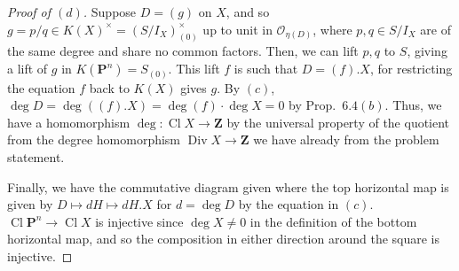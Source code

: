 \documentclass[10pt]{article}
\theoremstyle{definition}
\theoremstyle{remark}
\numberwithin{equation}{section}
\numberwithin{figure}{subsubsection}
\DeclareMathOperator{\Div}{Div}
\DeclareMathOperator{\Cl}{Cl}
\newcommand{\OO}{\mathcal{O}}
\begin{document}
\begin{proof}[Proof of $(d)$]
  Suppose $D = (g)$ on $X$, and so $g = p/q \in K(X)^\times = (S/I_X)_{(0)}^\times$ up to unit in $\OO_{\eta(D)}$, where $p,q \in S/I_X$ are of the same degree and share no common factors. Then, we can lift $p,q$ to $S$, giving a lift of $g$ in $K(\mathbf{P}^n) = S_{(0)}$. This lift $f$ is such that $D = (f).X$, for restricting the equation $f$ back to $K(X)$ gives $g$. By $(c)$, $\deg D = \deg ((f).X) = \deg (f) \cdot \deg X = 0$ by Prop.~$6.4(b)$. Thus, we have a homomorphism $\deg\colon \Cl X \to \mathbf{Z}$ by the universal property of the quotient from the degree homomorphism $\Div X \to \mathbf{Z}$ we have already from the problem statement.
  \par Finally, we have the commutative diagram given where the top horizontal map is given by $D \mapsto dH \mapsto dH.X$ for $d = \deg D$ by the equation in $(c)$. $\Cl\mathbf{P}^n \to \Cl X$ is injective since $\deg X \ne 0$ in the definition of the bottom horizontal map, and so the composition in either direction around the square is injective.
\end{proof}
\end{document}
